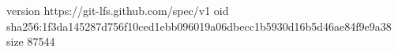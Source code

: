 version https://git-lfs.github.com/spec/v1
oid sha256:1f3da145287d756f10ced1ebb096019a06dbecc1b5930d16b5d46ae84f9e9a38
size 87544

